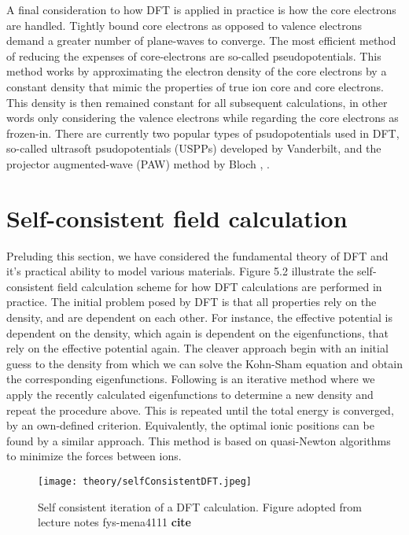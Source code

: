 A final consideration to how DFT is applied in practice is how the core electrons are handled. Tightly bound core electrons as opposed to valence electrons demand a greater number of plane-waves to converge. The most efficient method of reducing the expenses of core-electrons are so-called pseudopotentials. This method works by approximating the electron density of the core electrons by a constant density that mimic the properties of true ion core and core electrons. This density is then remained constant for all subsequent calculations, in other words only considering the valence electrons while regarding the core electrons as frozen-in. There are currently two popular types of psudopotentials used in DFT, so-called ultrasoft psudopotentials (USPPs) developed by Vanderbilt, and the projector augmented-wave (PAW) method by Bloch \cite{PAW1}, \cite{PAW2}.

\section{Self-consistent field calculation}
Preluding this section, we have considered the fundamental theory of DFT and it's practical ability to model various materials. Figure 5.2 illustrate the self-consistent field calculation scheme for how DFT calculations are performed in practice. The initial problem posed by DFT is that all properties rely on the density, and are dependent on each other. For instance, the effective potential is dependent on the density, which again is dependent on the eigenfunctions, that rely on the effective potential again. The cleaver approach begin with an initial guess to the density from which we can solve the Kohn-Sham equation and obtain the corresponding eigenfunctions. Following is an iterative method where we apply the recently calculated eigenfunctions to determine a new density and repeat the procedure above. This is repeated until the total energy is converged, by an own-defined criterion. Equivalently, the optimal ionic positions can be found by a similar approach. This method is based on quasi-Newton algorithms to minimize the forces between ions. 

\begin{figure}
\centering
\texttt{[image: theory/selfConsistentDFT.jpeg]}
\caption{Self consistent iteration of a DFT calculation. Figure adopted from lecture notes fys-mena4111 \textbf{cite}}
\label{sfDFT}
\end{figure}

